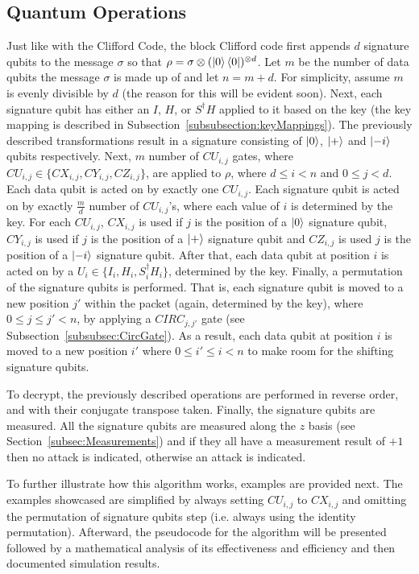 \subsection{Quantum Operations}
Just like with the Clifford Code, the block Clifford code first appends $d$ signature qubits to the message $\sigma$ so that $\rho = \sigma \otimes (\ket{0}\bra{0})^{\otimes d}$. Let $m$ be the number of data qubits the message $\sigma$ is made up of and let $n = m + d$. For simplicity, assume $m$ is evenly divisible by $d$ (the reason for this will be evident soon). Next, each signature qubit has either an $I$, $H$, or $S^{\dagger}H$ applied to it based on the key (the key mapping is described in Subsection~\ref{subsubsection:keyMappings}). The previously described transformations result in a signature consisting of $\ket{0}$, $\ket{+}$ and $\ket{-i}$ qubits respectively. Next, $m$ number of $\mathit{CU}_{i,j}$ gates, where $\mathit{CU}_{i,j} \in \{\mathit{CX}_{i,j}, \mathit{CY}_{i,j}, \mathit{CZ}_{i,j}\}$, are applied to $\rho$, where $d \leq i < n$ and $0 \leq j < d$. Each data qubit is acted on by exactly one $\mathit{CU}_{i,j}$. Each signature qubit is acted on by exactly $\frac{m}{d}$ number of $\mathit{CU}_{i,j}$'s, where each value of $i$ is determined by the key. For each $\mathit{CU}_{i,j}$, $\mathit{CX}_{i,j}$ is used if $j$ is the position of a $\ket{0}$ signature qubit, $\mathit{CY}_{i,j}$ is used if $j$ is the position of a $\ket{+}$ signature qubit and $\mathit{CZ}_{i,j}$ is used $j$ is the position of a $\ket{-i}$ signature qubit. After that, each data qubit at position $i$ is acted on by a $U_i \in \{I_i,H_i,S_i^{\dagger}H_i\}$, determined by the key. Finally, a permutation of the signature qubits is performed. That is, each signature qubit is moved to a new position $j'$ within the packet (again, determined by the key), where $0 \leq j \leq j' < n$,  by applying a $\mathit{CIRC}_{j,j'}$ gate (see Subsection~\ref{subsubsec:CircGate}). As a result, each data qubit at position $i$ is moved to a new position $i'$ where $0 \leq i' \leq i < n$ to make room for the shifting signature qubits.
 
To decrypt, the previously described operations are performed in reverse order, and with their conjugate transpose taken. Finally, the signature qubits are measured. All the signature qubits are measured along the $z$ basis (see Section~\ref{subsec:Measurements}) and if they all have a measurement result of $+1$ then no attack is indicated, otherwise an attack is indicated.

To further illustrate how this algorithm works, examples are provided next. The examples showcased are simplified by always setting $\mathit{CU}_{i,j}$ to $\mathit{CX}_{i,j}$ and omitting the permutation of signature qubits step (i.e. always using the identity permutation). Afterward, the pseudocode for the algorithm will be presented followed by a mathematical analysis of its effectiveness and efficiency and then documented simulation results.

